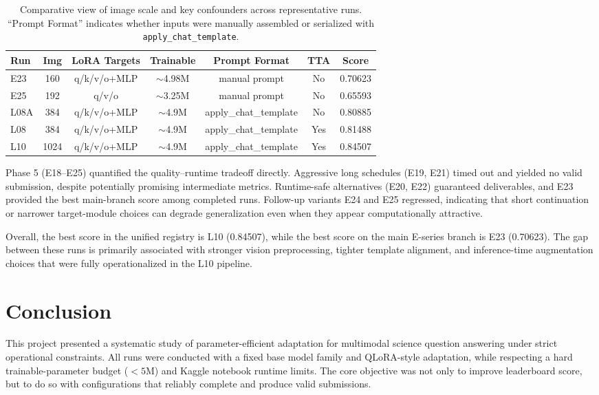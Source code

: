 \documentclass[11pt]{article}
\begin{document}
\begin{table}[t]
\centering
\scriptsize
\setlength{\tabcolsep}{3pt}
\begin{tabular}{l c c c c c c}
\hline
Run & Img & LoRA Targets & Trainable & Prompt Format & TTA & Score \\
\hline
E23 & 160 & q/k/v/o+MLP & $\sim$4.98M & manual prompt & No & 0.70623 \\
E25 & 192 & q/v/o & $\sim$3.25M & manual prompt & No & 0.65593 \\
L08A & 384 & q/k/v/o+MLP & $\sim$4.9M & apply\_chat\_template & No & 0.80885 \\
L08 & 384 & q/k/v/o+MLP & $\sim$4.9M & apply\_chat\_template & Yes & 0.81488 \\
L10 & 1024 & q/k/v/o+MLP & $\sim$4.9M & apply\_chat\_template & Yes & 0.84507 \\
\hline
\end{tabular}
\caption{Comparative view of image scale and key confounders across representative runs. ``Prompt Format'' indicates whether inputs were manually assembled or serialized with \texttt{apply\_chat\_template}.}
\label{tab:image-policy}
\end{table}

Phase 5 (E18--E25) quantified the quality--runtime tradeoff directly. Aggressive long schedules (E19, E21) timed out and yielded no valid submission, despite potentially promising intermediate metrics. Runtime-safe alternatives (E20, E22) guaranteed deliverables, and E23 provided the best main-branch score among completed runs. Follow-up variants E24 and E25 regressed, indicating that short continuation or narrower target-module choices can degrade generalization even when they appear computationally attractive.

Overall, the best score in the unified registry is L10 (0.84507), while the best score on the main E-series branch is E23 (0.70623). The gap between these runs is primarily associated with stronger vision preprocessing, tighter template alignment, and inference-time augmentation choices that were fully operationalized in the L10 pipeline.

\section{Conclusion}
This project presented a systematic study of parameter-efficient adaptation for multimodal science question answering under strict operational constraints. All runs were conducted with a fixed base model family and QLoRA-style adaptation, while respecting a hard trainable-parameter budget ($<5$M) and Kaggle notebook runtime limits. The core objective was not only to improve leaderboard score, but to do so with configurations that reliably complete and produce valid submissions.
\end{document}
